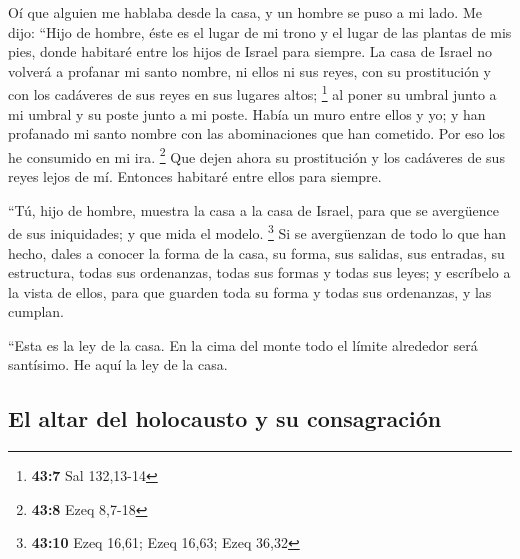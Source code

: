 \begin{paracol}{2}
 Oí que alguien me hablaba desde la casa, y un hombre se
puso a mi lado.  Me dijo: ``Hijo de hombre, éste es el
lugar de mi trono y el lugar de las plantas de mis pies, donde habitaré
entre los hijos de Israel para siempre. La casa de Israel no volverá a
profanar mi santo nombre, ni ellos ni sus reyes, con su prostitución y
con los cadáveres de sus reyes en sus lugares altos; \footnote{\textbf{43:7}
  Sal 132,13-14}  al poner su umbral junto a mi umbral y
su poste junto a mi poste. Había un muro entre ellos y yo; y han
profanado mi santo nombre con las abominaciones que han cometido. Por
eso los he consumido en mi ira. \footnote{\textbf{43:8} Ezeq 8,7-18}
 Que dejen ahora su prostitución y los cadáveres de sus
reyes lejos de mí. Entonces habitaré entre ellos para siempre.

 ``Tú, hijo de hombre, muestra la casa a la casa de
Israel, para que se avergüence de sus iniquidades; y que mida el modelo.
\footnote{\textbf{43:10} Ezeq 16,61; Ezeq 16,63; Ezeq 36,32}
 Si se avergüenzan de todo lo que han hecho, dales a
conocer la forma de la casa, su forma, sus salidas, sus entradas, su
estructura, todas sus ordenanzas, todas sus formas y todas sus leyes; y
escríbelo a la vista de ellos, para que guarden toda su forma y todas
sus ordenanzas, y las cumplan.

 ``Esta es la ley de la casa. En la cima del monte todo
el límite alrededor será santísimo. He aquí la ley de la casa.

\hypertarget{el-altar-del-holocausto-y-su-consagraciuxf3n}{%
\subsection{El altar del holocausto y su
consagración}\label{el-altar-del-holocausto-y-su-consagraciuxf3n}}


\end{paracol}
